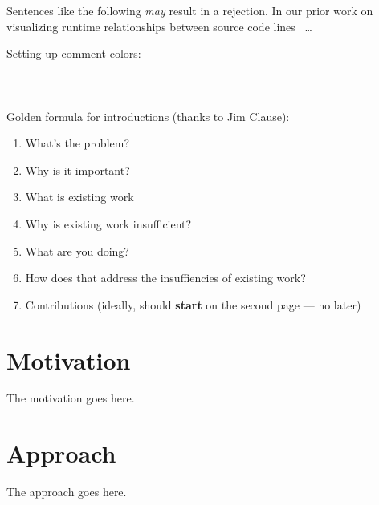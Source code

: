 \documentclass[conference]{IEEEtran}
\begin{document}
Sentences like the following \emph{may} result in a rejection. In our prior work on visualizing runtime relationships between source code lines~\cite{palepu13sep,palepu2015revealing,deng11sep} \ldots

Setting up comment colors:\\ 
\\
\\
\\

Golden formula for introductions (thanks to Jim Clause):
\begin{enumerate}
\item What's the problem?
\item Why is it important?
\item What is existing work
\item Why is existing work insufficient?
\item What are you doing?
\item How does that address the insuffiencies of existing work?
\item Contributions (ideally, should \textbf{start} on the second page --- no later)
\end{enumerate}








\section{Motivation}
The motivation goes here.

\section{Approach}
The approach goes here.
\end{document}

